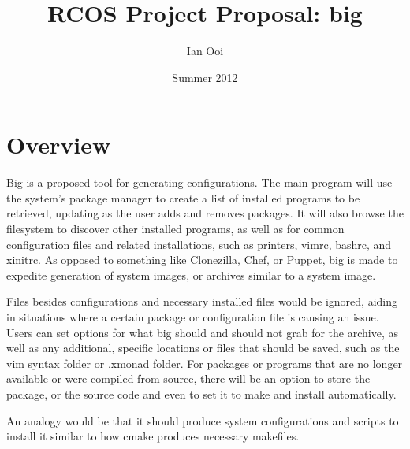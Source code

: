 \documentclass[10pt]{article}
\title{RCOS Project Proposal: big}
\author{Ian Ooi}
\date{Summer 2012}
\begin{document}
    \maketitle
    \section{Overview}
        Big is a proposed tool for generating configurations.  The main program will use the system's package manager to create a list of installed programs to be retrieved, updating as the user adds and removes packages.  It will also browse the filesystem to discover other installed programs, as well as for common configuration files and related installations, such as printers, vimrc, bashrc, and xinitrc.  As opposed to something like Clonezilla, Chef, or Puppet, big is made to expedite generation of system images, or archives similar to a system image.

       Files besides configurations and necessary installed files would be ignored, aiding in situations where a certain package or configuration file is causing an issue.  Users can set options for what big should  and should not grab for the archive, as well as any additional, specific locations or files that should be saved, such as the vim syntax folder or .xmonad folder.  For packages or programs that are no longer available or were compiled from source, there will be an option to store the package, or the source code and even to set it to make and install automatically.

        An analogy would be that it should produce system configurations and scripts to install it similar to how cmake produces necessary makefiles.

\end{document}
